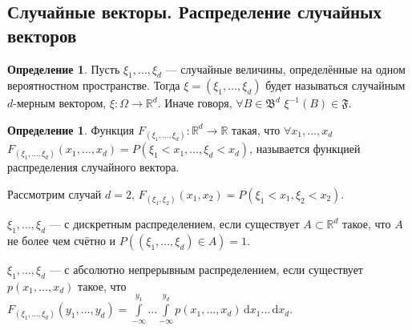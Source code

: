 \documentclass[11pt,openany,a4paper]{scrartcl}
\theoremstyle{plain}
\theoremstyle{definition}
\newtheorem{definition}[theorem]{Определение}
\newcommand\mb{\mathbb}
\newcommand\real{\mb R}
\newcommand{\dif}{\, \mathrm d}
\begin{document}
\subsection{Случайные векторы. Распределение случайных векторов}

\begin{definition}
    Пусть $\xi_1, \ldots, \xi_d$ — случайные величины, определённые на одном
    вероятностном пространстве. Тогда $\xi = (\xi_1, \ldots, \xi_d)$ будет
    называться случайным $d$-мерным вектором, $\xi: \Omega \to \real^d$.
    Иначе говоря, $\forall B \in \mathfrak B^d$ $\xi^{-1}(B) \in \mathfrak F$.
\end{definition}

\begin{definition}
    Функция $F_{(\xi_1, \ldots, \xi_d)}: \real^d \to \real$ такая, что
    $\forall x_1, \ldots, x_d$ $F_{(\xi_1, \ldots, \xi_d)}(x_1, \ldots, x_d) =
    P(\xi_1 < x_1, \ldots, \xi_d < x_d)$, называется функцией распределения
    случайного вектора.
\end{definition}

Рассмотрим случай $d = 2$, $F_{(\xi_1, \xi_2)} (x_1, x_2) =
P(\xi_1 < x_1, \xi_2 < x_2)$.

$\xi_1, \ldots, \xi_d$ — с дискретным распределением, если существует $A \subset 
\real^d$ такое, что $A$ не более чем счётно и
$P((\xi_1, \ldots, \xi_d) \in A) = 1$.

$\xi_1, \ldots, \xi_d$ — с абсолютно непрерывным распределением, если существует
$p(x_1, \ldots, x_d)$ такое, что $F_{(\xi_1, \ldots, \xi_d)}(y_1, \ldots, y_d) =
\int\limits_{-\infty}^{y_1} \ldots \int\limits_{-\infty}^{y_d}
p(x_1, \ldots, x_d) \dif x_1 \ldots \dif x_d$.
\end{document}
